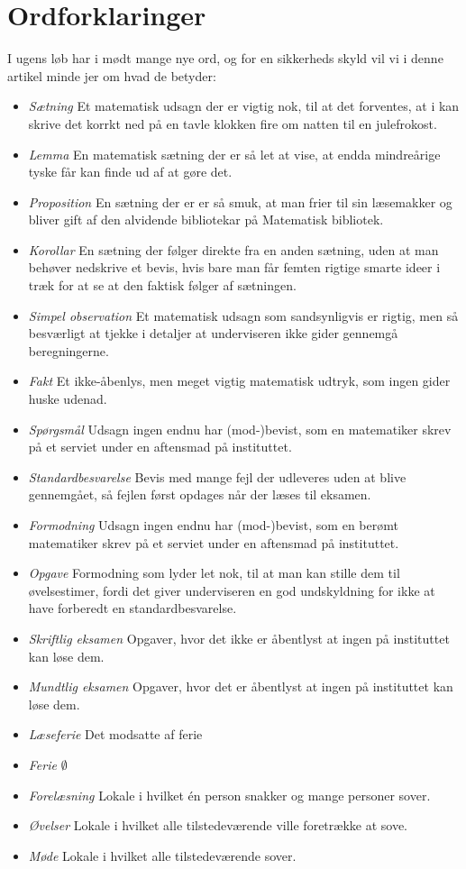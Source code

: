 \begin{minipage}[t]{100mm}
\vspace{3mm}
\section*{Ordforklaringer}
I ugens løb har i mødt mange nye ord, og for en sikkerheds skyld vil vi i denne artikel minde jer om hvad de betyder:
\begin{itemize}
\item \emph{Sætning} Et matematisk udsagn der er vigtig nok, til at det forventes, at i kan skrive det korrkt ned på en tavle klokken fire om natten til en julefrokost.
\item \emph{Lemma} En matematisk sætning der er så let at vise, at endda mindreårige tyske får kan finde ud af at gøre det.
\item \emph{Proposition} En sætning der er er så smuk, at man frier til sin læsemakker og bliver gift af den alvidende bibliotekar på Matematisk bibliotek.
\item \emph{Korollar} En sætning der følger direkte fra en anden sætning, uden at man behøver nedskrive et bevis, hvis bare man får femten rigtige smarte ideer i træk for at se at den faktisk følger af sætningen.
\item \emph{Simpel observation} Et matematisk udsagn som sandsynligvis er rigtig, men så besværligt at tjekke i detaljer at underviseren ikke gider gennemgå beregningerne.
\item \emph{Fakt} Et ikke-åbenlys, men meget vigtig matematisk udtryk, som ingen gider huske udenad.
\item \emph{Spørgsmål} Udsagn ingen endnu har (mod-)bevist, som en matematiker skrev på et serviet under en aftensmad på instituttet.
\item \emph{Standardbesvarelse} Bevis med mange fejl der udleveres uden at blive gennemgået, så fejlen først opdages når der læses til eksamen.
\item \emph{Formodning} Udsagn ingen endnu har (mod-)bevist, som en berømt matematiker skrev på et serviet under en aftensmad på instituttet.
\item \emph{Opgave} Formodning som lyder let nok, til at man kan stille dem til øvelsestimer, fordi det giver underviseren en god undskyldning for ikke at have forberedt en standardbesvarelse.
\item \emph{Skriftlig eksamen} Opgaver, hvor det ikke er åbentlyst at ingen på instituttet kan løse dem.
\item \emph{Mundtlig eksamen}  Opgaver, hvor det er åbentlyst at ingen på instituttet kan løse dem.
\item \emph{Læseferie} Det modsatte af ferie
\item \emph{Ferie} $\emptyset$
\item \emph{Forelæsning} Lokale i hvilket én person snakker og mange personer sover.
\item \emph{Øvelser} Lokale i hvilket alle tilstedeværende ville foretrække at sove.
\item \emph{Møde} Lokale i hvilket alle tilstedeværende sover.
\end{itemize}


\end{minipage}
